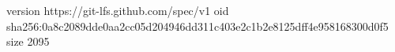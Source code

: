 version https://git-lfs.github.com/spec/v1
oid sha256:0a8c2089dde0aa2cc05d204946dd311c403e2c1b2e8125dff4e958168300d0f5
size 2095

